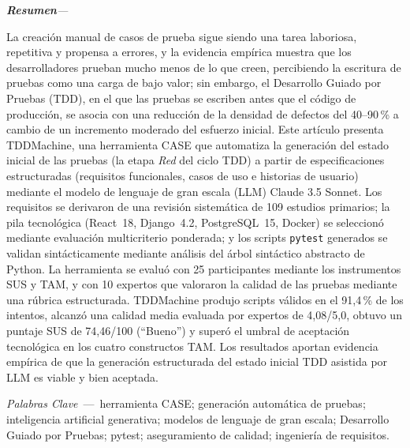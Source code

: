 \documentclass[10pt,journal,twoside,letterpaper]{IEEEtran}
\renewcommand{\figurename}{Fig.}%
\renewcommand{\tablename}{TABLE}%
\renewcommand{\refname}{References}%
\renewcommand{\bibname}{References}%
\newenvironment{resumen}{%
    \vspace{0.3em}
    \noindent\normalfont\small\itshape\textbf{Resumen}\hspace{0.5em}\textmd{---}\hspace{0.3em}%
    \ignorespaces
}{%
    \par\vspace{0.3em}%
}
\newcommand{\palabrasclave}[1]{%
    \vspace{0.2em}
    \noindent\small\textit{Palabras Clave}~---~#1
    \par\vspace{0.4em}
}
\begin{document}
    \begin{resumen}
        La creación manual de casos de prueba sigue siendo una tarea laboriosa, repetitiva y propensa a errores, y la evidencia empírica muestra que los desarrolladores prueban mucho menos de lo que creen, percibiendo la escritura de pruebas como una carga de bajo valor; sin embargo, el Desarrollo Guiado por Pruebas (TDD), en el que las pruebas se escriben antes que el código de producción, se asocia con una reducción de la densidad de defectos del 40--90\,\% a cambio de un incremento moderado del esfuerzo inicial. Este artículo presenta TDDMachine, una herramienta CASE que automatiza la generación del estado inicial de las pruebas (la etapa \emph{Red} del ciclo TDD) a partir de especificaciones estructuradas (requisitos funcionales, casos de uso e historias de usuario) mediante el modelo de lenguaje de gran escala (LLM) Claude 3.5 Sonnet. Los requisitos se derivaron de una revisión sistemática de 109 estudios primarios; la pila tecnológica (React~18, Django~4.2, PostgreSQL~15, Docker) se seleccionó mediante evaluación multicriterio ponderada; y los scripts \texttt{pytest} generados se validan sintácticamente mediante análisis del árbol sintáctico abstracto de Python. La herramienta se evaluó con 25 participantes mediante los instrumentos SUS y TAM, y con 10 expertos que valoraron la calidad de las pruebas mediante una rúbrica estructurada. TDDMachine produjo scripts válidos en el 91,4\,\% de los intentos, alcanzó una calidad media evaluada por expertos de 4,08/5,0, obtuvo un puntaje SUS de 74,46/100 (``Bueno'') y superó el umbral de aceptación tecnológica en los cuatro constructos TAM. Los resultados aportan evidencia empírica de que la generación estructurada del estado inicial TDD asistida por LLM es viable y bien aceptada.
    \end{resumen}
    
    \palabrasclave{herramienta CASE; generación automática de pruebas; inteligencia artificial generativa; modelos de lenguaje de gran escala; Desarrollo Guiado por Pruebas; pytest; aseguramiento de calidad; ingeniería de requisitos.}
    
    \renewcommand{\figurename}{Fig.}
    \renewcommand{\tablename}{TABLE}
    \renewcommand{\refname}{References}
    \renewcommand{\bibname}{References}
    
\end{document}
